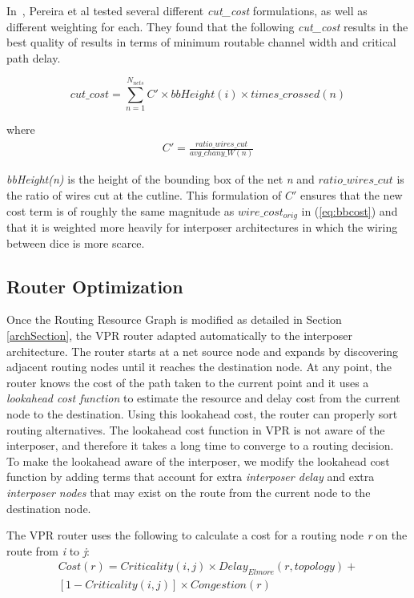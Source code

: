 \documentclass{sig-alternate-2013}
\begin{document}
In~\cite{hahn2014cad}, Pereira et al tested several different \textit{cut\_cost} formulations, as well as different weighting for each. They found that the following \textit{cut\_cost} results in the best quality of results in terms of minimum routable channel width and critical path delay.

\begin{equation} \label{eq:cost2}
cut\_cost = \sum_{n=1}^{N_{nets}} C' \times bbHeight(i) \times times\_crossed(n)
\end{equation}

where 
\begin{equation} \label{eq:cprime}
\begin{split}
C' = \frac{ratio\_wires\_cut}{avg\_chany\_W(n)}
\end{split}
\end{equation}

\textit{bbHeight(n)} is the height of the bounding box of the net \textit{n} and $ratio\_wires\_cut$ is the ratio of wires cut at the cutline. This formulation of $C'$ ensures that the new cost term is of roughly the same magnitude as $wire\_cost_{orig}$ in (\ref{eq:bbcost}) and that it is weighted more heavily for interposer architectures in which the wiring between dice is more scarce.

\subsection{Router Optimization}
Once the Routing Resource Graph is modified as detailed in Section \ref{archSection}, the VPR router adapted automatically to the interposer architecture. The router starts at a net source node and expands by discovering adjacent routing nodes until it reaches the destination node. At any point, the router knows the cost of the path taken to the current point and it uses a \textit{lookahead cost function} to estimate the resource and delay cost from the current node to the destination. Using this lookahead cost, the router can properly sort routing alternatives. The lookahead cost function in VPR is not aware of the interposer, and therefore it takes a long time to converge to a routing decision. To make the lookahead aware of the interposer, we modify the lookahead cost function by adding terms that account for extra \textit{interposer delay} and extra \textit{interposer nodes} that may exist on the route from the current node to the destination node.

The VPR router uses the following to calculate a cost for a routing node \textit{r} on the route from \textit{i} to \textit{j}:
\begin{equation} \label{eq:routing_cost}
\begin{split}
Cost(r) = Criticality(i,j) \times Delay_{Elmore}(r, topology) + \\ [1-Criticality(i,j)] \times Congestion(r)
\end{split}
\end{equation}
\end{document}
